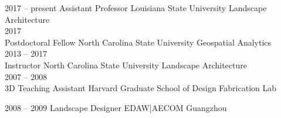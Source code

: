\documentclass[10pt]{developercv} %
\begin{document}

\begin{entrylist}
	\entry
		{2017 -- present}
		{Assistant Professor}
		{Louisiana State University}
		{Landscape Architecture\\
		}
	\entry
		{2017\\\footnotesize{}}
		{Postdoctoral Fellow}
		{North Carolina State University}
		{Geospatial Analytics\\
		}
	\entry
		{2013 -- 2017\\\footnotesize{}}
		{Instructor}
		{North Carolina State University}
		{Landscape Architecture\\
		}
	\entry
		{2007 -- 2008\\\footnotesize{}}
		{3D Teaching Assistant}
		{Harvard Graduate School of Design}
		{Fabrication Lab\\
		}
\end{entrylist}


\begin{entrylist}
	\entry
		{2008 -- 2009}
		{Landscape Designer}
		{EDAW|AECOM Guangzhou}
		{%
		}
\end{entrylist}

\clearpage


\nocite{*}
\setlength\bibitemsep{0.75em}

\printbibliography[title={\cvsect{Books}}, type=book, heading=subbibliography]

\printbibliography[title={\cvsect{Selected Papers}}, keyword=select, heading=subbibliography]


\end{document}
